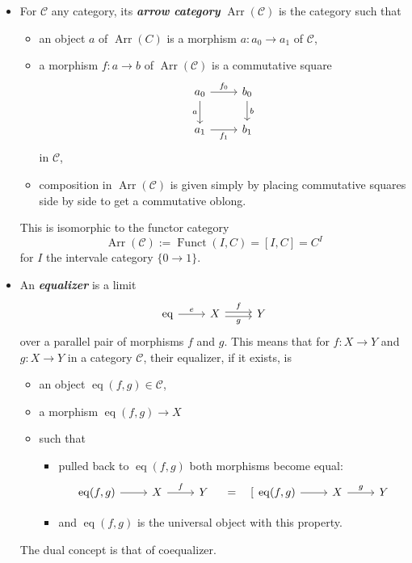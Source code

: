 \documentclass{article}
\newcommand{\Cc}{\mathcal{C}}
\DeclareMathOperator{\Arr}{Arr}
\DeclareMathOperator{\Funct}{Funct}
\DeclareMathOperator{\eq}{eq}
\begin{document}
\begin{defn}
\begin{itemize}
		\item \label{defn:arrow-cat}
		 For $\Cc$ any category, its \textbf{\textit{arrow category}} $\Arr(\Cc)$ is the category such that
		\begin{itemize}
			\item an object $a$ of $\Arr(C)$ is a morphism $a:a_0\to a_1$ of $\Cc$,
			\item a morphism $f:a\to b$ of $\Arr(\Cc)$ is a commutative square
			\[\begin{tikzcd}
				a_0\arrow[r,"f_0"]\arrow[d,swap,"a"]&b_0\arrow[d,"b"]\\
				a_1\arrow[r,swap,"f_1"]&b_1
			\end{tikzcd}\]
			in $\Cc$,
			\item composition in $\Arr(\Cc)$ is given simply by placing commutative squares side by side to get a commutative oblong.
		\end{itemize}
		This is isomorphic to the functor category
		\[\Arr(\Cc):=\Funct(I,C)=[I,C]=C^I\]
		for $I$ the intervale category $\{0\to 1\}$.
		
		\item An \textbf{\textit{equalizer}} is a limit 
		\[\begin{tikzcd}
			\eq\arrow[r,"e"]&X\arrow[r,shift={(0,0.07)},"f"]\arrow[r,shift={(0,-0.07)},"g",swap]&Y
		\end{tikzcd}\]
		over a parallel pair of morphisms $f$ and $g$. This means that for $f:X\to Y$ and $g:X\to Y$ in a category $\Cc$, their equalizer, if it exists, is
		\begin{itemize}
			\item an object $\eq(f,g)\in\Cc$,
			\item a morphism $\eq(f,g)\to X$
			\item such that
			\begin{itemize}
				\item pulled back to $\eq(f,g)$ both morphisms become equal:
				\[\begin{tikzcd}
					\eq(f,g)\arrow[r]&X\arrow[r,"f"]&Y
				\end{tikzcd}\quad=\quad
				[\begin{tikzcd}
					\eq(f,g)\arrow[r]&X\arrow[r,"g"]&Y
				\end{tikzcd}\]
				\item and $\eq(f,g)$ is the universal object with this property.
			\end{itemize}
		\end{itemize}
		The dual concept is that of coequalizer.
		

\end{itemize}
\end{defn}
\end{document}
